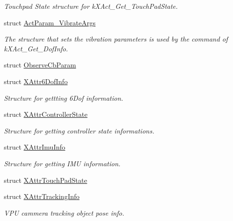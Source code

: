 \begin{DoxyCompactItemize}
\begin{DoxyCompactList}\small\item\em Touchpad State structure for k\+X\+Act\+\_\+\+Get\+\_\+\+Touch\+Pad\+State. \end{DoxyCompactList}\item 
struct \mbox{\hyperlink{struct_ximmerse_1_1_input_system_1_1_x_device_plugin_1_1_act_param___vibrate_args}{Act\+Param\+\_\+\+Vibrate\+Args}}
\begin{DoxyCompactList}\small\item\em The structure that sets the vibration parameters is used by the command of k\+X\+Act\+\_\+\+Get\+\_\+Dof\+Info. \end{DoxyCompactList}\item 
struct \mbox{\hyperlink{struct_ximmerse_1_1_input_system_1_1_x_device_plugin_1_1_observe_cb_param}{Observe\+Cb\+Param}}
\item 
struct \mbox{\hyperlink{struct_ximmerse_1_1_input_system_1_1_x_device_plugin_1_1_x_attr6_dof_info}{X\+Attr6\+Dof\+Info}}
\begin{DoxyCompactList}\small\item\em Structure for gettting 6\+Dof information. \end{DoxyCompactList}\item 
struct \mbox{\hyperlink{struct_ximmerse_1_1_input_system_1_1_x_device_plugin_1_1_x_attr_controller_state}{X\+Attr\+Controller\+State}}
\begin{DoxyCompactList}\small\item\em Structure for getting controller state informations. \end{DoxyCompactList}\item 
struct \mbox{\hyperlink{struct_ximmerse_1_1_input_system_1_1_x_device_plugin_1_1_x_attr_imu_info}{X\+Attr\+Imu\+Info}}
\begin{DoxyCompactList}\small\item\em Structure for getting I\+MU information. \end{DoxyCompactList}\item 
struct \mbox{\hyperlink{struct_ximmerse_1_1_input_system_1_1_x_device_plugin_1_1_x_attr_touch_pad_state}{X\+Attr\+Touch\+Pad\+State}}
\item 
struct \mbox{\hyperlink{struct_ximmerse_1_1_input_system_1_1_x_device_plugin_1_1_x_attr_tracking_info}{X\+Attr\+Tracking\+Info}}
\begin{DoxyCompactList}\small\item\em V\+PU cammera tracking object pose info. \end{DoxyCompactList}\item 

\end{DoxyCompactItemize}
